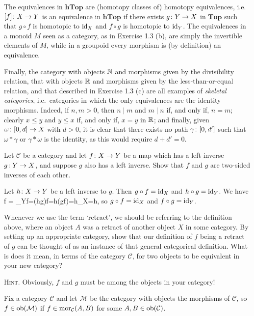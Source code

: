The equivalences in $\mathbf{hTop}$ are (homotopy classes of) homotopy equivalences, i.e.\ $[f]\colon X\to Y$ is an equivalence in $\mathbf{hTop}$ if there exists $g\colon Y \to X$ in $\mathbf{Top}$ such that $g\circ f$ is homotopic to $\mathrm{id}_X$ and $f\circ g$ is homotopic to $\mathrm{id}_Y$.
\een
The equivalences in a monoid $M$ seen as a category, as in Exercise 1.3 (b), are simply the invertible elements of $M$, while in a groupoid every morphism is (by definition) an equivalence.

Finally, the category with objects $\mathbb{N}$ and morphisms given by the divisibility relation, that with objects $\mathbb{R}$ and morphisms given by the less-than-or-equal relation, and that described in Exercise 1.3 (c) are all examples of \emph{skeletal categories}, i.e.\ categories in which the only equivalences are the identity morphisms. Indeed, if $n,m>0$, then $n\mid m$ and $m\mid n$ if, and only if, $n=m$; clearly $x\leq y$ and $y\leq x$ if, and only if, $x=y$ in $\mathbb{R}$; and finally, given $\omega\colon [0,d]\to X$ with $d>0$, it is clear that there exists no path $\gamma\colon [0,d']$ such that $\omega * \gamma$ or $\gamma * \omega$ is the identity, as this would require $d+d'=0$.
\een
\es

\bp
Let $\mathcal{C}$ be a category and let $f \colon X \to Y$ be a map which has a left inverse $g \colon Y \to X$, and suppose $g$ also has a left inverse. Show that $f$ and $g$ are two-sided inverses of each other.
\ep

\bs
Let $h\colon X\to Y$ be a left inverse to $g$. Then $g\circ f=\mathrm{id}_X$ and $h\circ g=\mathrm{id}_Y$. We have
\bse
f = \id_Y\circ f=(h\circ g)\circ f=h\circ (g\circ f)=h\circ \id_X=h,
\ese
so $g\circ f=\mathrm{id}_X$ and $f\circ g=\mathrm{id}_Y$.
\es


\bx
Whenever we use the term `retract', we should be referring to the definition above, where an object $A$ was a retract of another object $X$ in some category. By setting up an appropriate category, show that our definition of $f$ being a retract of $g$ can be thought of as an instance of that general categorical definition. What is does it mean, in terms of the category $\mathcal{C}$, for two objects to be equivalent in your new category?

{\scshape Hint}. Obviously, $f$ and $g$ must be among the objects in your category!
\ex

\bs
Fix a category $\mathcal{C}$ and let $\mathcal{M}$ be the category with objects the morphisms of $\mathcal{C}$, so $f\in \operatorname{ob}(\mathcal{M})$ if $f\in \operatorname{mor}_{\mathcal{C}}(A,B)$ for some $A,B\in \operatorname{ob}(\mathcal{C})$.

